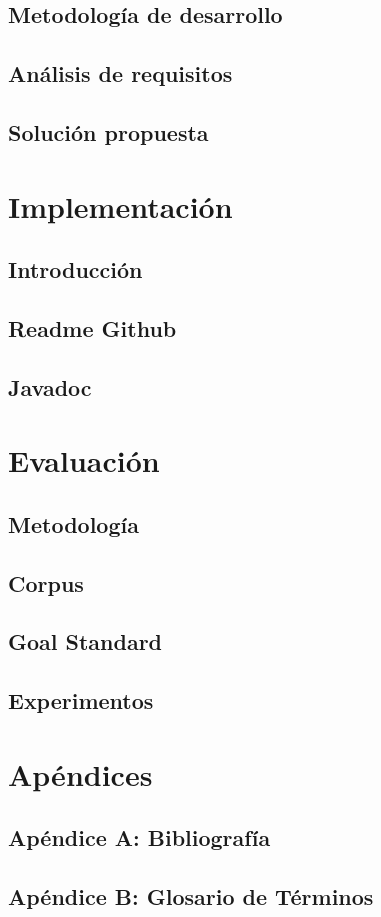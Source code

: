 \documentclass[14pt]{extarticle}
\theoremstyle{definition}
\theoremstyle{remark}
\begin{document}
\subsection{Metodología de desarrollo}\label{sec:metodologiadedesarrollo}
\subsection{Análisis de requisitos}\label{sec:analisisderequisitos}
\subsection{Solución propuesta}\label{sec:solucionpropuesta}
\section{Implementación}\label{sec:implementacion}
\subsection{Introducción}\label{sec:introduccion}
\subsection{Readme Github}\label{sec:readmegithub}
\subsection{Javadoc}\label{sec:javadoc}
\section{Evaluación}\label{sec:evaluacion}
\subsection{Metodología}\label{sec:metodologia}
\subsection{Corpus}\label{sec:corpus}
\subsection{Goal Standard}\label{sec:goalstandard}
\subsection{Experimentos}\label{sec:experimentos}
\section{Apéndices}\label{sec:apendices}
\subsection{Apéndice A: Bibliografía}\label{sec:bibliografia}



\newpage
\subsection{Apéndice B: Glosario de Términos}\label{sec:glosariodeterminos}
\end{document}
